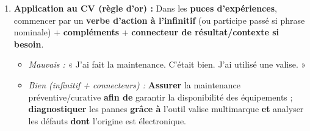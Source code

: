 \documentclass[11pt]{article}
\newcommand{\cle}[1]{{\popxbold\color{popdark}#1}}
\begin{document}
\begin{methode}
\begin{enumerate}
\begin{itemize}
                  \item \cle{qui} (sujet) : \textit{Le technicien \textbf{qui} a réparé la machine est parti.}
                  \item \cle{que} (COD) : \textit{La machine \textbf{que} j'ai réparée fonctionne.} (Accord !)
                  \item \cle{dont} (objet prépositionnel \textit{de}) : \textit{L'entreprise \textbf{dont} je dépends...} / \textit{Le projet \textbf{dont} j'ai la charge...}
                  \item \cle{où} (lieu, temps) : \textit{L'usine \textbf{où} j'ai travaillé...} / \textit{L'année \textbf{où} j'ai obtenu mon BT...}
                  \item \cle{lequel, laquelle, lesquels, lesquelles} (après préposition \textit{à, pour, avec, sans, dans, sur...}) : \textit{L'outil \textbf{avec lequel} je travaille...}
              \end{itemize}
        \item \textbf{Application au CV (règle d'or) :} Dans les \textbf{puces d'expériences}, commencer par un \textbf{verbe d'action à l'infinitif} (ou participe passé si phrase nominale) + \textbf{compléments} + \textbf{connecteur de résultat/contexte si besoin}.
              \begin{itemize}
                  \item \textit{Mauvais :} « J'ai fait la maintenance. C'était bien. J'ai utilisé une valise. »
                  \item \textit{Bien (infinitif + connecteurs) :} \textbf{Assurer} la maintenance préventive/curative \textbf{afin de} garantir la disponibilité des équipements ; \textbf{diagnostiquer} les pannes \textbf{grâce à} l'outil valise multimarque \textbf{et} analyser les défauts \textbf{dont} l'origine est électronique.
              \end{itemize}
    \end{enumerate}
\end{methode}
\end{document}
